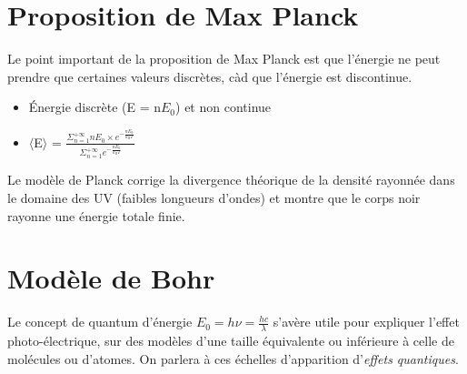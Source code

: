 \documentclass{article}
\begin{document}
\section{Proposition de Max Planck}
Le point important de la proposition de Max Planck est que l'énergie ne peut prendre que certaines valeurs discrètes, càd que l'énergie est discontinue.
\begin{itemize}
    \item Énergie discrète (E = n$E_{0}$) et non continue
    \item $\langle$E$\rangle$ = $\frac{\Sigma_{n=1}^{+\infty} nE_{0} \times e^{-\frac{nE_{0}}{k_{B}T}}}{\Sigma_{n=1}^{+\infty} e^{-\frac{nE_{0}}{k_{B}T}}}$
\end{itemize}
Le modèle de Planck corrige la divergence théorique de la densité rayonnée dans le domaine des UV (faibles longueurs d'ondes) et montre que le corps noir rayonne une énergie totale finie.

\section{Modèle de Bohr}
Le concept de quantum d'énergie $E_{0} = h\nu = \frac{hc}{\lambda}$ s'avère utile pour expliquer l'effet photo-électrique, sur des modèles d'une taille équivalente ou inférieure à celle de molécules ou d'atomes. On parlera à ces échelles d'apparition d'\textit{effets quantiques}.
\end{document}
